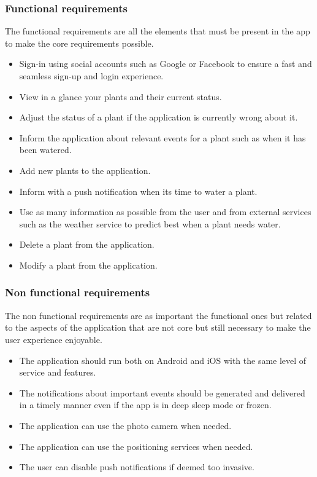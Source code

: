 \documentclass[10pt]{article}
\begin{document}
	\subsubsection{Functional requirements}
	The functional requirements are all the elements that must be present in the app to make the core requirements possible.
	\begin{itemize}
		\item Sign-in using social accounts such as Google or Facebook to ensure a fast and seamless sign-up and login experience.
		\item View in a glance your plants and their current status.
		\item Adjust the status of a plant if the application is currently wrong about it.
		\item Inform the application about relevant events for a plant such as when it has been watered.
		\item Add new plants to the application.
		\item Inform with a push notification when its time to water a plant.
		\item Use as many information as possible from the user and from external services such as the weather service to predict best when a plant needs water.
		\item Delete a plant from the application.
		\item Modify a plant from the application.
	\end{itemize}
	
	\newpage
	\subsubsection{Non functional requirements}
	The non functional requirements are as important the functional ones but related to the aspects of the application that are not core but still necessary to make the user experience enjoyable.
	\begin{itemize}
		\item The application should run both on Android and iOS with the same level of service and features.
		\item The notifications about important events should be generated and delivered in a timely manner even if the app is in deep sleep mode or frozen. 
		\item The application can use the photo camera when needed.
		\item The application can use the positioning services when needed.
		\item The user can disable push notifications if deemed too invasive.
	\end{itemize}
\end{document}
